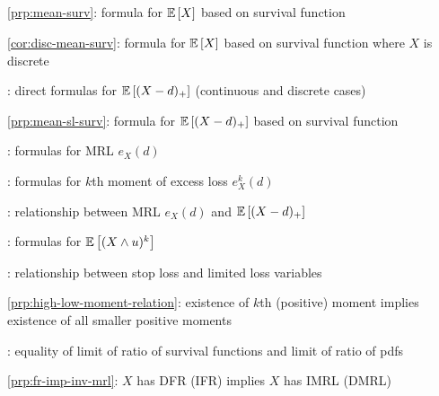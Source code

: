 \subsection*{}
\item \cref{prp:mean-surv}: formula for \(\mathbb{E}\left[X\right]\) based on survival function
\item \cref{cor:disc-mean-surv}: formula for \(\mathbb{E}\left[X\right]\) based on survival function where \(X\) is discrete
\item {}: direct formulas for \(\mathbb{E}\left[(X-d)_{+}\right]\) (continuous and discrete cases)
\item \cref{prp:mean-sl-surv}: formula for \(\mathbb{E}\left[(X-d)_{+}\right]\) based on survival function
\item {}: formulas for MRL \(e_X(d)\)
\item {}: formulas for \(k\)th moment of excess loss \(e_X^k(d)\)
\item {}: relationship between MRL \(e_X(d)\) and \(\mathbb{E}\left[(X-d)_{+}\right]\)
\item {}: formulas for \(\mathbb{E}\left[(X\wedge u)^{k}\right]\)
\item {}: relationship between stop loss and limited loss variables
\item \cref{prp:high-low-moment-relation}: existence of \(k\)th (positive) moment implies existence of all smaller positive moments
\item {}: equality of limit of ratio of survival functions and limit of ratio of pdfs
\item \cref{prp:fr-imp-inv-mrl}: \(X\) has DFR (IFR) implies \(X\) has IMRL (DMRL)
